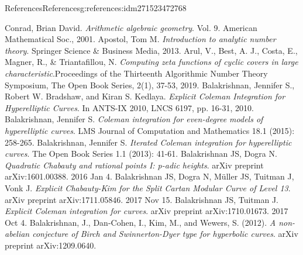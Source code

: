 \documentclass[oneside,10pt,]{book}
\numberwithin{equation}{section}
\begin{document}
\begin{references-chapter-numberless}{References}{}{References}{}{}{g:references:idm271523472768}
\begin{thebibliography}{9}
\hypertarget{x:biblio:bib-arith-alg-geom}{}Conrad, Brian David. \textit{Arithmetic algebraic geometry}. Vol. 9. American Mathematical Soc., 2001.
\hypertarget{x:biblio:bib-apostol}{}Apostol, Tom M. \textit{Introduction to analytic number theory}. Springer Science \& Business Media, 2013.
\hypertarget{x:biblio:bib-arul-bcmt}{}Arul, V., Best, A. J., Costa, E., Magner, R., \& Triantafillou, N. \textit{Computing zeta functions of cyclic covers in large characteristic}.Proceedings of the Thirteenth Algorithmic Number Theory Symposium, The Open Book Series, 2(1), 37-53, 2019.
\hypertarget{x:biblio:bib-balakrishnan-bradshaw-kedlaya}{}Balakrishnan, Jennifer S., Robert W. Bradshaw, and Kiran S. Kedlaya. \textit{Explicit Coleman Integration for Hyperelliptic Curves}. In ANTS-IX 2010, LNCS 6197, pp. 16-31, 2010.
\hypertarget{x:biblio:bib-balakrishnan-even}{}Balakrishnan, Jennifer S. \textit{Coleman integration for even-degree models of hyperelliptic curves}. LMS Journal of Computation and Mathematics 18.1 (2015): 258-265.
\hypertarget{x:biblio:bib-balakrishnan-iterated}{}Balakrishnan, Jennifer S. \textit{Iterated Coleman integration for hyperelliptic curves}. The Open Book Series 1.1 (2013): 41-61.
\hypertarget{x:biblio:bib-balakrishnan-dogra}{}Balakrishnan JS, Dogra N. \textit{Quadratic Chabauty and rational points I: p-adic heights}. arXiv preprint arXiv:1601.00388. 2016 Jan 4.
\hypertarget{x:biblio:bib-balakrishnan-dogra-muller-tuitman-vonk}{}Balakrishnan JS, Dogra N, Müller JS, Tuitman J, Vonk J. \textit{Explicit Chabauty-Kim for the Split Cartan Modular Curve of Level 13}. arXiv preprint arXiv:1711.05846. 2017 Nov 15.
\hypertarget{x:biblio:bib-balakrishnan-tuitman}{}Balakrishnan JS, Tuitman J. \textit{Explicit Coleman integration for curves}. arXiv preprint arXiv:1710.01673. 2017 Oct 4.
\hypertarget{x:biblio:bib-bala-nonab}{}Balakrishnan, J., Dan-Cohen, I., Kim, M., and Wewers, S. (2012). \textit{A non-abelian conjecture of Birch and Swinnerton-Dyer type for hyperbolic curves}. arXiv preprint arXiv:1209.0640.

\end{thebibliography}
\end{references-chapter-numberless}
\end{document}
